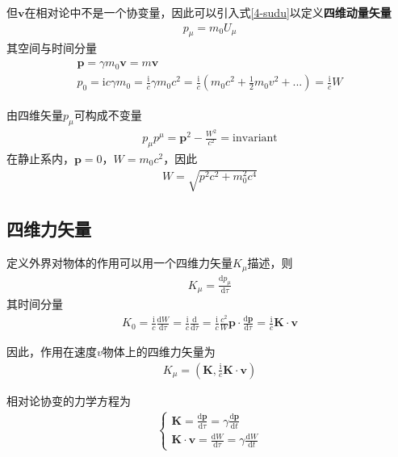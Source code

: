 \documentclass[main.tex]{subfiles}
\begin{document}
但$\boldsymbol{v}$在相对论中不是一个协变量，因此可以引入式\ref{4-sudu}以定义\textbf{四维动量矢量}
\begin{align}
    p_{\mu} = m_0U_{\mu}
\end{align}
其空间与时间分量
\begin{align}
    \begin{array}{c}
    \boldsymbol{p} = \gamma m_0 \boldsymbol{v} = m\boldsymbol{v}\\
    p_0 = \mathrm{i}c\gamma m_0 = \displaystyle \frac{\mathrm{i}}{c}\gamma m_0 c^2 = \frac{\mathrm{i}}{c}\left(m_0 c^2 + \frac{1}{2}m_0v^2+...\right) = \frac{\mathrm{i}}{c}W
    \end{array}
\end{align}

由四维矢量$p_{\mu}$可构成不变量
\begin{align}
    p_{\mu}p^{\mu} = \boldsymbol{p}^2 -  \frac{W^2}{c^2} = \mathrm{invariant}
\end{align}
在静止系内，$\boldsymbol{p} = 0$，$W = m_0c^2$，因此
\begin{align}
    W = \sqrt{p^2 c^2 + m_0^2 c^4}
\end{align}

\subsection{四维力矢量}
定义外界对物体的作用可以用一个四维力矢量$K_{\mu}$描述，则
\begin{align}
    K_{\mu} = \frac{\mathrm{d}p_{\mu}}{\mathrm{d}\tau}
\end{align}
其时间分量
\begin{align}
    K_0 = \frac{\mathrm{i}}{c} \frac{\mathrm{d}W}{\mathrm{d}\tau} = \frac{\mathrm{i}}{c} \frac{\mathrm{d}}{\mathrm{d}\tau} = \frac{\mathrm{i}}{c} \frac{c^2}{W}\boldsymbol{p} \cdot \frac{\mathrm{d}\boldsymbol{p}}{\mathrm{d}\tau} = \frac{\mathrm{i}}{c} \boldsymbol{K} \cdot \boldsymbol{v}
\end{align}

因此，作用在速度$v$物体上的四维力矢量为
\begin{align}
    K_{\mu} = \left(\boldsymbol{K},\frac{\mathrm{i}}{c}\boldsymbol{K} \cdot \boldsymbol{v} \right)
\end{align}

相对论协变的力学方程为
\begin{align}
    \left\{\begin{array}{l}
         \boldsymbol{K} = \displaystyle \frac{\mathrm{d} \boldsymbol{p}} {\mathrm{d} \tau} = \displaystyle \gamma \frac{\mathrm{d} \boldsymbol{p}} {\mathrm{d} t} \\
          \boldsymbol{K} \cdot \boldsymbol{v} = \displaystyle \frac{\mathrm{d} W} {\mathrm{d} \tau} = \displaystyle \gamma \frac{\mathrm{d} W} {\mathrm{d} t}
    \end{array}\right.
\end{align}
\end{document}
